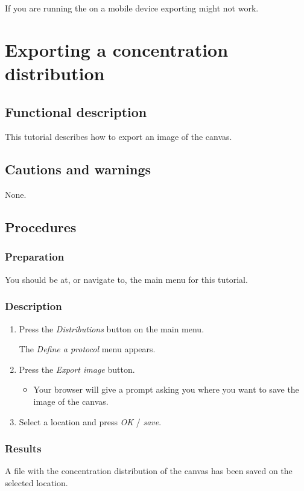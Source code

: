 If you are running the \applicationname on a mobile device exporting might not work.


\section{Exporting a concentration distribution}
\label{sec:exportDist}

\subsection{Functional description}
This tutorial describes how to export an image of the canvas.

\subsection{Cautions and warnings}
None.

\subsection{Procedures}
\subsubsection{Preparation}
You should be at, or navigate to, the main menu for this tutorial.

\subsubsection{Description}
\begin{enumerate}
	\item Press the \emph{Distributions} button on the main menu.
		\begin{itemize}
            The \emph{Define a protocol} menu appears.
		\end{itemize}
	\item Press the \emph{Export image} button.
		\begin{itemize}
            \item Your browser will give a prompt asking you where you want to save the image of the canvas.
		\end{itemize}
	\item  Select a location and press \emph{OK} / \emph{save}.
\end{enumerate}

\subsubsection{Results}
A file with the concentration distribution of the canvas has been saved on the selected location.

